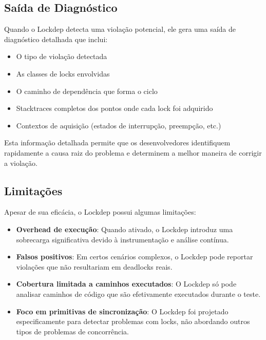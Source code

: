 \subsection{Saída de Diagnóstico}

Quando o Lockdep detecta uma violação potencial, ele gera uma saída de diagnóstico detalhada que inclui:

\begin{itemize}
    \item O tipo de violação detectada
    \item As classes de locks envolvidas
    \item O caminho de dependência que forma o ciclo
    \item Stacktraces completos dos pontos onde cada lock foi adquirido
    \item Contextos de aquisição (estados de interrupção, preempção, etc.)
\end{itemize}

Esta informação detalhada permite que os desenvolvedores identifiquem rapidamente a causa raiz do problema e determinem a melhor maneira de corrigir a violação.

\subsection{Limitações}

Apesar de sua eficácia, o Lockdep possui algumas limitações:

\begin{itemize}
    \item \textbf{Overhead de execução}: Quando ativado, o Lockdep introduz uma sobrecarga significativa devido à instrumentação e análise contínua.

    \item \textbf{Falsos positivos}: Em certos cenários complexos, o Lockdep pode reportar violações que não resultariam em deadlocks reais.

    \item \textbf{Cobertura limitada a caminhos executados}: O Lockdep só pode analisar caminhos de código que são efetivamente executados durante o teste.

    \item \textbf{Foco em primitivas de sincronização}: O Lockdep foi projetado especificamente para detectar problemas com locks, não abordando outros tipos de problemas de concorrência.
\end{itemize}

